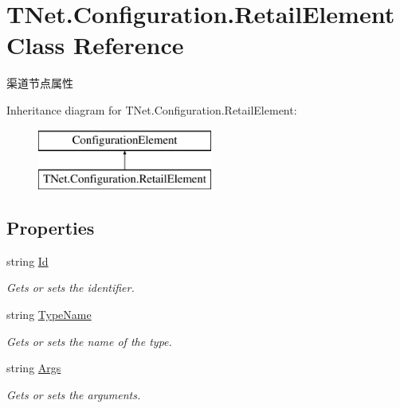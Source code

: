 \hypertarget{class_t_net_1_1_configuration_1_1_retail_element}{}\section{T\+Net.\+Configuration.\+Retail\+Element Class Reference}
\label{class_t_net_1_1_configuration_1_1_retail_element}


渠道节点属性  


Inheritance diagram for T\+Net.\+Configuration.\+Retail\+Element\+:\begin{figure}[H]
\begin{center}
\leavevmode
\includegraphics[height=2.000000cm]{class_t_net_1_1_configuration_1_1_retail_element}
\end{center}
\end{figure}
\subsection*{Properties}
\begin{DoxyCompactItemize}
\item 
string \mbox{\hyperlink{class_t_net_1_1_configuration_1_1_retail_element_a4111403d13d24892a5d0cf7026b54ecb}{Id}}
\begin{DoxyCompactList}\small\item\em Gets or sets the identifier. \end{DoxyCompactList}\item 
string \mbox{\hyperlink{class_t_net_1_1_configuration_1_1_retail_element_a24a72763296d8b48c0622fb6ea424059}{Type\+Name}}
\begin{DoxyCompactList}\small\item\em Gets or sets the name of the type. \end{DoxyCompactList}\item 
string \mbox{\hyperlink{class_t_net_1_1_configuration_1_1_retail_element_ac5365b7ea225af38fd3b05c818a8fb99}{Args}}
\begin{DoxyCompactList}\small\item\em Gets or sets the arguments. \end{DoxyCompactList}\end{DoxyCompactItemize}


